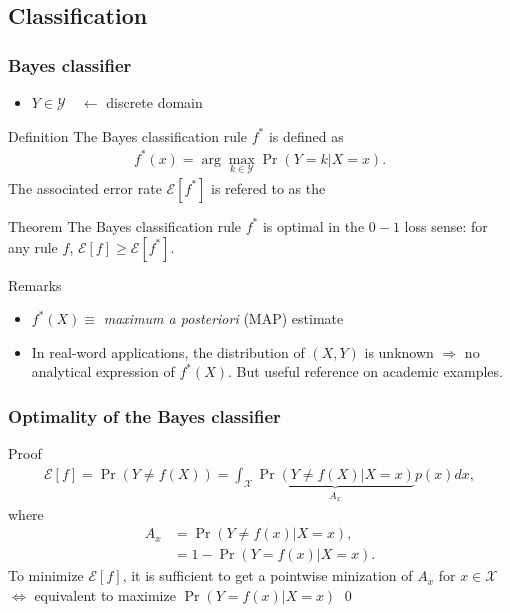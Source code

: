 \documentclass[compress, smaller, serif, 9pt]{beamer}
\begin{document}
\subsection{Classification}
\begin{frame}
  \frametitle{Bayes classifier}
  \begin{itemize}
   \item $Y \in \mathcal{Y} \quad \leftarrow$ discrete domain
  \end{itemize}

  \begin{block}{Definition}
  The Bayes classification rule $f^{\ast}$ is defined as
   \begin{align*}
    f^{\ast}(x)= \arg \max_{k \in\mathcal{Y}  } \Pr( Y= k | X=x).
   \end{align*}
   The associated error rate  $\mathcal{E}[f^{\ast}]$ is refered to as the \color{blue}{Bayesian error rate}
  \end{block}
 \begin{block}{Theorem}
 The Bayes classification rule $f^{\ast}$ is optimal in the $0-1$ loss sense: 
   for any rule $f$, $\mathcal{E}[f] \ge \mathcal{E}[f^{\ast}]$.
 \end{block}
  \begin{block}{Remarks}
   \begin{itemize}
    \item $f^{\ast}(X) \equiv$  {\it maximum a posteriori} (MAP) estimate
    \item In real-word applications,  the distribution of $(X,Y)$ is unknown $\Rightarrow$ no analytical expression  of $f^{\ast}(X)$. 
    But useful reference on academic examples.
   \end{itemize}

 \end{block}
\end{frame}

\begin{frame}
  \frametitle{Optimality of the Bayes classifier}
\begin{block}{Proof}
 \begin{align*}
  \mathcal{E}[f]= \Pr( Y \ne f(X) ) = \int_\mathcal{X} \underbrace{\Pr( Y \ne f(X) |X=x )}_{A_x} p(x) dx,
 \end{align*}
 where
  \begin{align*}
  A_x &= \Pr( Y \ne f(x) |X=x ),\\
  &= 1 - \Pr( Y = f(x) |X=x ).
 \end{align*}
 To minimize $\mathcal{E}[f]$, it is sufficient to get  a pointwise minization of $A_x$ for $x \in \mathcal{X}  $
 $\Leftrightarrow$
 equivalent to maximize $\Pr( Y = f(x) |X=x )$ \qed
 \end{block}
\end{frame}
\end{document}
